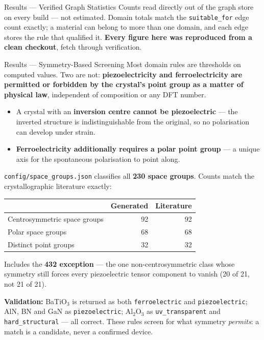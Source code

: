 \documentclass{beamer}
\begin{document}
\begin{frame}{Results --- Verified Graph Statistics}
\vspace{0.2cm}
\footnotesize
Counts read directly out of the graph store on every build --- not estimated. Domain totals match the \texttt{suitable\_for} edge count exactly; a material can belong to more than one domain, and each edge stores the rule that qualified it. \textbf{Every figure here was reproduced from a clean checkout}, fetch through verification.
\end{frame}

\begin{frame}{Results --- Symmetry-Based Screening}
Most domain rules are thresholds on computed values. Two are not: \textbf{piezoelectricity and ferroelectricity are permitted or forbidden by the crystal's point group as a matter of physical law}, independent of composition or any DFT number.

\vspace{0.2cm}
\begin{itemize}\small
    \item A crystal with an \textbf{inversion centre cannot be piezoelectric} --- the inverted structure is indistinguishable from the original, so no polarisation can develop under strain.
    \item \textbf{Ferroelectricity additionally requires a polar point group} --- a unique axis for the spontaneous polarisation to point along.
\end{itemize}

\vspace{0.2cm}
\texttt{config/space\_groups.json} classifies all \textbf{230 space groups}. Counts match the crystallographic literature exactly:

\vspace{0.1cm}
\centering
\small
\begin{tabular}{lrr}
\toprule
& \textbf{Generated} & \textbf{Literature} \\
\midrule
Centrosymmetric space groups & 92 & 92 \\
Polar space groups & 68 & 68 \\
Distinct point groups & 32 & 32 \\
\bottomrule
\end{tabular}

\vspace{0.25cm}
\raggedright
\footnotesize
Includes the \textbf{432 exception} --- the one non-centrosymmetric class whose symmetry still forces every piezoelectric tensor component to vanish (20 of 21, not 21 of 21).

\textbf{Validation:} BaTiO$_3$ is returned as both \texttt{ferroelectric} and \texttt{piezoelectric}; AlN, BN and GaN as \texttt{piezoelectric}; Al$_2$O$_3$ as \texttt{uv\_transparent} and \texttt{hard\_structural} --- all correct. These rules screen for what symmetry \textit{permits}: a match is a candidate, never a confirmed device.
\end{frame}
\end{document}
